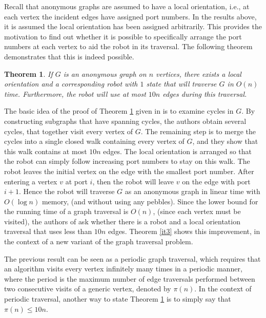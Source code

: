 \documentclass[12pt,letterpaper,oneside]{book}
\newtheorem{theorem}{Theorem}[section]
\begin{document}
Recall that anonymous graphs are assumed to have a local orientation, i.e., at each vertex 
the incident edges have assigned port numbers.  
In the results above, it is assumed the local orientation has been assigned arbitrarily.  
This provides the motivation to find out whether it is possible to specifically arrange 
the port numbers at each vertex to aid the robot in its traversal.  The following 
theorem demonstrates that this is indeed possible.  


\begin{theorem}\label{it2}
\emph{\cite{DJSS}} If $G$ is an anonymous graph on $n$ vertices, there exists a local orientation and a corresponding robot with $1$ state that 
will traverse $G$ in $O(n)$ time.  Furthermore, the robot will use at most $10n$ edges during this traversal.  
\end{theorem}

The basic idea of the proof of Theorem \ref{it2} given in \cite{DJSS} is to examine cycles in $G$.  
By constructing subgraphs that have spanning cycles, the authors obtain several cycles, that together visit 
every vertex of $G$.  The remaining step is to merge the cycles into a single closed walk containing every vertex of $G$, and they show that 
this walk contains at most $10n$ edges.  The local orientation 
is arranged so that the robot can simply follow increasing port numbers to stay on this walk.  
The robot leaves the initial vertex on the edge with the smallest port number.  
After entering a vertex $v$ at port $i$, then the robot will 
leave $v$ on the edge with port $i+1$.  
Hence the robot will traverse $G$ as an anonymous graph in linear time with 
$O(\log n)$ memory, (and without using any pebbles).  Since the lower bound for the running time of a graph traversal is 
$O(n)$, (since each vertex must be visited), the authors of \cite{DJSS} ask whether there is a robot 
and a local orientation  
traversal that uses less than $10n$ edges.  
Theorem \ref{it3} shows this improvement, in the context of a new variant of the graph traversal problem.  


The previous result can be seen as a periodic graph traversal, which 
requires that an algorithm visits every vertex 
infinitely many times in a periodic manner, where the period is the maximum number of edge traversals 
performed between two consecutive visits of a generic 
vertex, denoted by $\pi(n)$.  In the context of periodic traversal, another way to state Theorem \ref{it2} is to simply 
say that $\pi(n)\le 10n$.  
\end{document}
